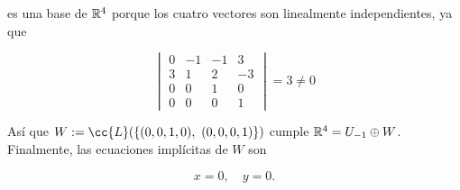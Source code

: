\documentclass[12pt]{article}
\begin{document}
\begin{ejercicio}[2.5 puntos]
\begin{enumerate}
			es una base de ${\mathbb{R}}^4$ porque los cuatro vectores son linealmente independientes, ya que
			
			$$ 
			\begin{vmatrix}
				0 & -1 & -1 & 3 \\
				3 & 1 & 2 & -3 \\
				0 & 0 & 1 & 0 \\
				0 & 0 & 0 & 1
			\end{vmatrix} = 3 \ne 0$$
			
			Así que $W := \cc{L}(\{(0, 0, 1, 0),\ (0, 0, 0, 1)\})$ cumple 
			${\mathbb{R}}^4 = U_{-1}\oplus W$. Finalmente, las ecuaciones implícitas de $W$ son
			
			$$ x=0, \quad y=0.$$
		\end{enumerate}
	\end{ejercicio}
		
\end{document}
